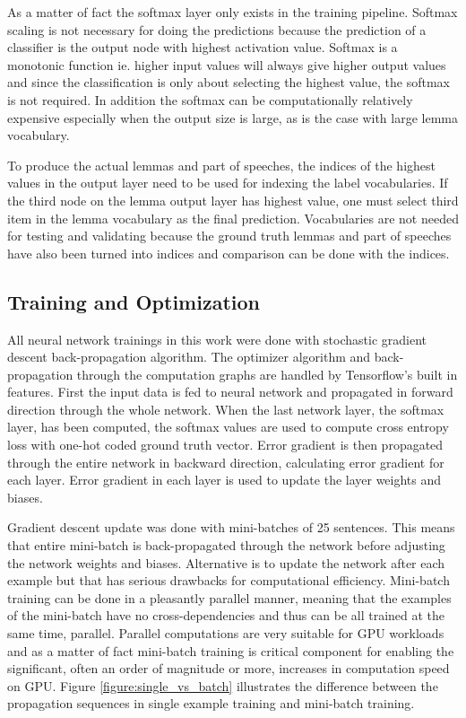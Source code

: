 \documentclass[12pt,a4paper,english
]{tutthesis}
\begin{document}
As a matter of fact the softmax layer only exists in the training pipeline. Softmax scaling is not necessary for doing the predictions because the prediction of a classifier is the output node with highest activation value. Softmax is a monotonic function ie. higher input values will always give higher output values and since the classification is only about selecting the highest value, the softmax is not required. In addition the softmax can be computationally relatively expensive especially when the output size is large, as is the case with large lemma vocabulary.

To produce the actual lemmas and part of speeches, the indices of the highest values in the output layer need to be used for indexing the label vocabularies. If the third node on the lemma output layer has highest value, one must select third item in the lemma vocabulary as the final prediction. Vocabularies are not needed for testing and validating because the ground truth lemmas and part of speeches have also been turned into indices and comparison can be done with the indices.

\subsection{Training and Optimization}
All neural network trainings in this work were done with stochastic gradient descent back-propagation algorithm. The optimizer algorithm and back-propagation through the computation graphs are handled by Tensorflow's built in features. First the input data is fed to neural network and propagated in forward direction through the whole network. When the last network layer, the softmax layer, has been computed, the softmax values are used to compute cross entropy loss with one-hot coded ground truth vector. Error gradient is then propagated through the entire network in backward direction, calculating error gradient for each layer. Error gradient in each layer is used to update the layer weights and biases.

Gradient descent update was done with mini-batches of 25 sentences. This means that entire mini-batch is back-propagated through the network before adjusting the network weights and biases. Alternative is to update the network after each example but that has serious drawbacks for computational efficiency. Mini-batch training can be done in a pleasantly parallel manner, meaning that the examples of the mini-batch have no cross-dependencies and thus can be all trained at the same time, parallel. Parallel computations are very suitable for GPU workloads and as a matter of fact mini-batch training is critical component for enabling the significant, often an order of magnitude or more, increases in computation speed on GPU. Figure \ref{figure:single_vs_batch} illustrates the difference between the propagation sequences in single example training and mini-batch training.
\end{document}
